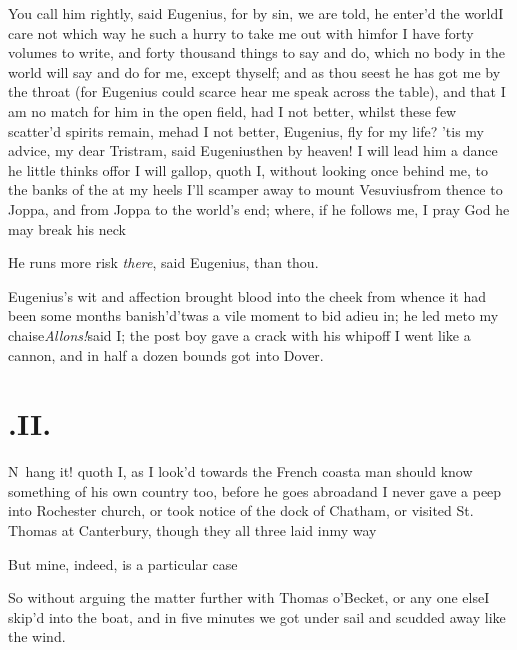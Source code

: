 \documentclass{article}
\begin{document}
\tsk You call him rightly, said Eugenius,\break
\tsk for by sin, we are told, he enter’d the world\tsh I care not which way he
 such a hurry to take me out with him\tsk for
I have forty volumes to write, and forty thousand things to say and do, which no body
in the world will say and do for me, except thyself; and as thou seest he has got
me by the throat (for Eugenius could scarce hear me speak across the table), and
that I am no match for him in the open field, had I not better, 
whilst these few scatter’d spirits remain, 
me\tsk had I not better, Eugenius, fly for my life? ’tis my
advice, my dear Tristram, said Eugenius\tsk then by heaven! I
will lead him a dance he little thinks of\tsh for I will gallop,
quoth I, without looking once behind me, to the banks of the
 at my heels\tsh
I’ll scamper away to mount Vesuvius\tsh from thence to Jop\-pa,
and from Joppa to the world’s end; where, if he follows me, I
pray God he may break his neck\tsh{}

\tsh He runs more risk \textit{there}, said Eugenius,
than thou.

Eugenius’s wit and affection brought blood into the
cheek from whence it had been some months
banish’d\tsh ’twas a vile moment to bid adieu
in; he led me\break to my chaise\tsh \textit{Allons!}\@ said I; the
post boy gave a crack with his whip\tsh off I went like a
cannon, and in half a dozen bounds got into Dover.

\vfill{}\eject
\section{.\enspace II.}

\lettrine{N}{\,} hang it! quoth I, as I look’d towards the French coast\tsk a man should
know something of his own\break
country too, before he goes abroad\tsh and I never gave a
peep into Rochester church, or took notice of the dock of Chatham, or visited St.\@
Thomas at Canterbury, though they all three laid in\break my way\tsh

\tsk But mine, indeed, is a particular case\tsh

So without arguing the matter further with Thomas o’Becket, or any one else\tsk I
skip’d into the boat, and in five minutes we got under sail and scudded away like
the wind.
\end{document}
